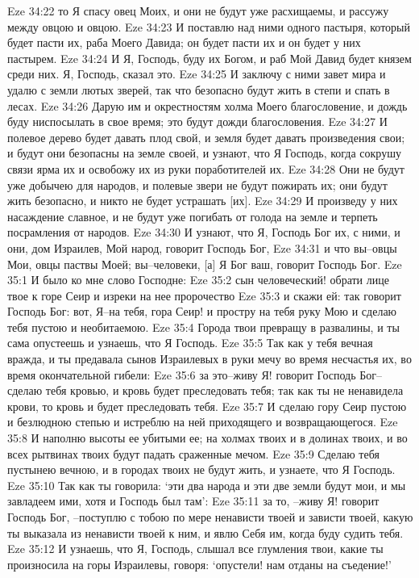 Eze 34:22  то Я спасу овец Моих, и они не будут уже расхищаемы, и рассужу между овцою и овцою.
Eze 34:23  И поставлю над ними одного пастыря, который будет пасти их, раба Моего Давида; он будет пасти их и он будет у них пастырем.
Eze 34:24  И Я, Господь, буду их Богом, и раб Мой Давид будет князем среди них. Я, Господь, сказал это.
Eze 34:25  И заключу с ними завет мира и удалю с земли лютых зверей, так что безопасно будут жить в степи и спать в лесах.
Eze 34:26  Дарую им и окрестностям холма Моего благословение, и дождь буду ниспосылать в свое время; это будут дожди благословения.
Eze 34:27  И полевое дерево будет давать плод свой, и земля будет давать произведения свои; и будут они безопасны на земле своей, и узнают, что Я Господь, когда сокрушу связи ярма их и освобожу их из руки поработителей их.
Eze 34:28  Они не будут уже добычею для народов, и полевые звери не будут пожирать их; они будут жить безопасно, и никто не будет устрашать [их].
Eze 34:29  И произведу у них насаждение славное, и не будут уже погибать от голода на земле и терпеть посрамления от народов.
Eze 34:30  И узнают, что Я, Господь Бог их, с ними, и они, дом Израилев, Мой народ, говорит Господь Бог,
Eze 34:31  и что вы--овцы Мои, овцы паствы Моей; вы--человеки, [а] Я Бог ваш, говорит Господь Бог.
Eze 35:1  И было ко мне слово Господне:
Eze 35:2  сын человеческий! обрати лице твое к горе Сеир и изреки на нее пророчество
Eze 35:3  и скажи ей: так говорит Господь Бог: вот, Я--на тебя, гора Сеир! и простру на тебя руку Мою и сделаю тебя пустою и необитаемою.
Eze 35:4  Города твои превращу в развалины, и ты сама опустеешь и узнаешь, что Я Господь.
Eze 35:5  Так как у тебя вечная вражда, и ты предавала сынов Израилевых в руки мечу во время несчастья их, во время окончательной гибели:
Eze 35:6  за это--живу Я! говорит Господь Бог--сделаю тебя кровью, и кровь будет преследовать тебя; так как ты не ненавидела крови, то кровь и будет преследовать тебя.
Eze 35:7  И сделаю гору Сеир пустою и безлюдною степью и истреблю на ней приходящего и возвращающегося.
Eze 35:8  И наполню высоты ее убитыми ее; на холмах твоих и в долинах твоих, и во всех рытвинах твоих будут падать сраженные мечом.
Eze 35:9  Сделаю тебя пустынею вечною, и в городах твоих не будут жить, и узнаете, что Я Господь.
Eze 35:10  Так как ты говорила: `эти два народа и эти две земли будут мои, и мы завладеем ими, хотя и Господь был там':
Eze 35:11  за то, --живу Я! говорит Господь Бог, --поступлю с тобою по мере ненависти твоей и зависти твоей, какую ты выказала из ненависти твоей к ним, и явлю Себя им, когда буду судить тебя.
Eze 35:12  И узнаешь, что Я, Господь, слышал все глумления твои, какие ты произносила на горы Израилевы, говоря: `опустели! нам отданы на съедение!'
